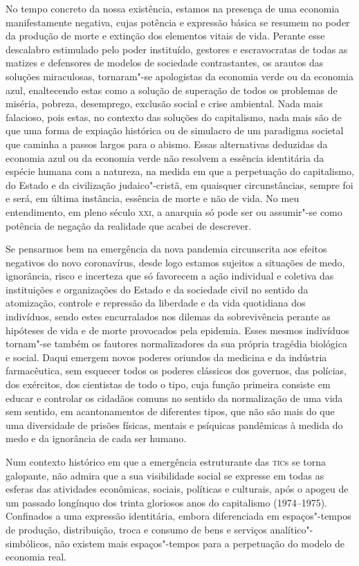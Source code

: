 No tempo concreto da nossa existência, estamos na presença de uma
economia manifestamente negativa, cujas potência e expressão básica se
resumem no poder da produção de morte e extinção dos elementos vitais de
vida. Perante esse descalabro estimulado pelo poder instituído, gestores
e escravocratas de todas as matizes e defensores de modelos de sociedade
contrastantes, os arautos das soluções miraculosas, tornaram"-se
apologistas da economia verde ou da economia azul, enaltecendo estas
como a solução de superação de todos os problemas de miséria, pobreza,
desemprego, exclusão social e crise ambiental. Nada mais falacioso, pois
estas, no contexto das soluções do capitalismo, nada mais são de que uma
forma de expiação histórica ou de simulacro de um paradigma societal que
caminha a passos largos para o abismo. Essas alternativas deduzidas da
economia azul ou da economia verde não resolvem a essência identitária
da espécie humana com a natureza, na medida em que a perpetuação do
capitalismo, do Estado e da civilização judaico"-cristã, em quaisquer
circunstâncias, sempre foi e será, em última instância, essência de
morte e não de vida. No meu entendimento, em pleno século \textsc{xxi}, a
anarquia só pode ser ou assumir"-se como potência de negação da realidade
que acabei de descrever.

Se pensarmos bem na emergência da nova pandemia circunscrita aos efeitos
negativos do novo coronavírus, desde logo estamos sujeitos a situações
de medo, ignorância, risco e incerteza que só favorecem a ação
individual e coletiva das instituições e organizações do Estado e da
sociedade civil no sentido da atomização, controle e repressão da
liberdade e da vida quotidiana dos indivíduos, sendo estes encurralados
nos dilemas da sobrevivência perante as hipóteses de vida e de morte
provocados pela epidemia. Esses mesmos indivíduos tornam"-se também os
fautores normalizadores da sua própria tragédia biológica e social.
Daqui emergem novos poderes oriundos da medicina e da indústria
farmacêutica, sem esquecer todos os poderes clássicos dos governos, das
polícias, dos exércitos, dos cientistas de todo o tipo, cuja função
primeira consiste em educar e controlar os cidadãos comuns no sentido da
normalização de uma vida sem sentido, em acantonamentos de diferentes
tipos, que não são mais do que uma diversidade de prisões físicas,
mentais e psíquicas pandêmicas à medida do medo e da ignorância de cada
ser humano.

Num contexto histórico em que a emergência estruturante das \textsc{tic}s se
torna galopante, não admira que a sua visibilidade social se expresse em
todas as esferas das atividades econômicas, sociais, políticas e
culturais, após o apogeu de um passado longínquo dos trinta gloriosos
anos do capitalismo (1974--1975). Confinados a uma expressão identitária,
embora diferenciada em espaços"-tempos de produção, distribuição, troca e
consumo de bens e serviços analítico"-simbólicos, não existem mais
espaços"-tempos para a perpetuação do modelo de economia real.

